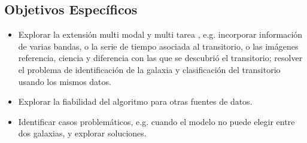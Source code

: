 \documentclass[../tesis.tex]{subfiles}
\begin{document}
\subsection{Objetivos Específicos}
\begin{itemize}
    \item Explorar la extensión multi modal y multi tarea , e.g. incorporar información de varias bandas, o la serie de tiempo asociada al transitorio, o las imágenes referencia, ciencia y diferencia con las que se descubrió el transitorio; resolver el problema de identificación de la galaxia y clasificación del transitorio usando los mismos datos.
    \item Explorar la fiabilidad del algoritmo para otras fuentes de datos.
    \item Identificar casos problemáticos, e.g. cuando el modelo no puede elegir entre dos galaxias, y explorar soluciones.
\end{itemize}
\end{document}
